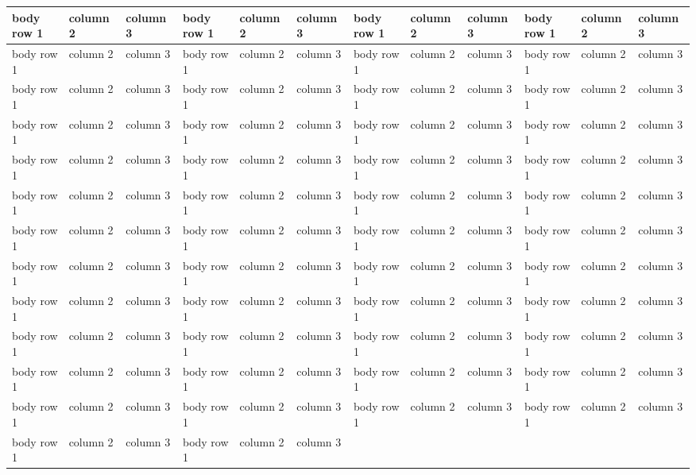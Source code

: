 \documentclass[a4paper,11pt,french]{rtdsphinxmanual}
\begin{document}
\begin{longtable}{|l|l|l|l|l|l|l|l|l|l|l|l|}
body row 1
 & 
column 2
 & 
column 3
 & 
body row 1
 & 
column 2
 & 
column 3
 & 
body row 1
 & 
column 2
 & 
column 3
 & 
body row 1
 & 
column 2
 & 
column 3
\\
\hline
body row 1
 & 
column 2
 & 
column 3
 & 
body row 1
 & 
column 2
 & 
column 3
 & 
body row 1
 & 
column 2
 & 
column 3
 & 
body row 1
 & 
column 2
 & 
column 3
\\
\hline
body row 1
 & 
column 2
 & 
column 3
 & 
body row 1
 & 
column 2
 & 
column 3
 & 
body row 1
 & 
column 2
 & 
column 3
 & 
body row 1
 & 
column 2
 & 
column 3
\\
\hline
body row 1
 & 
column 2
 & 
column 3
 & 
body row 1
 & 
column 2
 & 
column 3
 & 
body row 1
 & 
column 2
 & 
column 3
 & 
body row 1
 & 
column 2
 & 
column 3
\\
\hline
body row 1
 & 
column 2
 & 
column 3
 & 
body row 1
 & 
column 2
 & 
column 3
 & 
body row 1
 & 
column 2
 & 
column 3
 & 
body row 1
 & 
column 2
 & 
column 3
\\
\hline
body row 1
 & 
column 2
 & 
column 3
 & 
body row 1
 & 
column 2
 & 
column 3
 & 
body row 1
 & 
column 2
 & 
column 3
 & 
body row 1
 & 
column 2
 & 
column 3
\\
\hline
body row 1
 & 
column 2
 & 
column 3
 & 
body row 1
 & 
column 2
 & 
column 3
 & 
body row 1
 & 
column 2
 & 
column 3
 & 
body row 1
 & 
column 2
 & 
column 3
\\
\hline
body row 1
 & 
column 2
 & 
column 3
 & 
body row 1
 & 
column 2
 & 
column 3
 & 
body row 1
 & 
column 2
 & 
column 3
 & 
body row 1
 & 
column 2
 & 
column 3
\\
\hline
body row 1
 & 
column 2
 & 
column 3
 & 
body row 1
 & 
column 2
 & 
column 3
 & 
body row 1
 & 
column 2
 & 
column 3
 & 
body row 1
 & 
column 2
 & 
column 3
\\
\hline
body row 1
 & 
column 2
 & 
column 3
 & 
body row 1
 & 
column 2
 & 
column 3
 & 
body row 1
 & 
column 2
 & 
column 3
 & 
body row 1
 & 
column 2
 & 
column 3
\\
\hline
body row 1
 & 
column 2
 & 
column 3
 & 
body row 1
 & 
column 2
 & 
column 3
 & 
body row 1
 & 
column 2
 & 
column 3
 & 
body row 1
 & 
column 2
 & 
column 3
\\
\hline
body row 1
 & 
column 2
 & 
column 3
 & 
body row 1
 & 
column 2
 & 
column 3
 & 
body row 1
 & 
column 2
 & 
column 3
 & 
body row 1
 & 
column 2
 & 
column 3
\\
\hline
body row 1
 & 
column 2
 & 
column 3
 & 
body row 1
 & 
column 2
 & 
column 3
 & 

\end{longtable}
\end{document}
